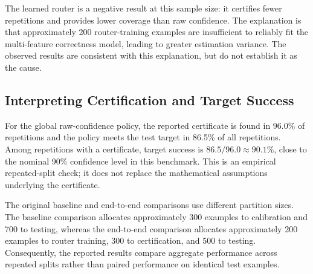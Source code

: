 \documentclass[11pt]{article}
\begin{document}
The learned router is a negative result at this sample size: it certifies fewer repetitions and provides lower coverage than raw confidence. The explanation is that approximately 200 router-training examples are insufficient to reliably fit the multi-feature correctness model, leading to greater estimation variance. The observed results are consistent with this explanation, but do not establish it as the cause.

\subsection{Interpreting Certification and Target Success}
For the global raw-confidence policy, the reported certificate is found in 96.0\% of repetitions and the policy meets the test target in 86.5\% of all repetitions. Among repetitions with a certificate, target success is $86.5/96.0\approx90.1\%$, close to the nominal 90\% confidence level in this benchmark. This is an empirical repeated-split check; it does not replace the mathematical assumptions underlying the certificate.

The original baseline and end-to-end comparisons use different partition sizes. The baseline comparison allocates approximately 300 examples to calibration and 700 to testing, whereas the end-to-end comparison allocates approximately 200 examples to router training, 300 to certification, and 500 to testing. Consequently, the reported results compare aggregate performance across repeated splits rather than paired performance on identical test examples.

\end{document}
